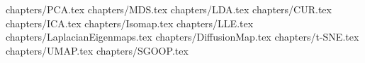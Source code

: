 \clearpage 
 {chapters/PCA.tex}
\clearpage
 {chapters/MDS.tex}
\clearpage
 {chapters/LDA.tex}
\clearpage
 {chapters/CUR.tex}
\clearpage
 {chapters/ICA.tex}
\clearpage
 {chapters/Isomap.tex}
\clearpage
 {chapters/LLE.tex}
\clearpage
 {chapters/LaplacianEigenmaps.tex}
\clearpage
 {chapters/DiffusionMap.tex}
\clearpage
 {chapters/t-SNE.tex}
\clearpage
 {chapters/UMAP.tex}
\clearpage
 {chapters/SGOOP.tex}